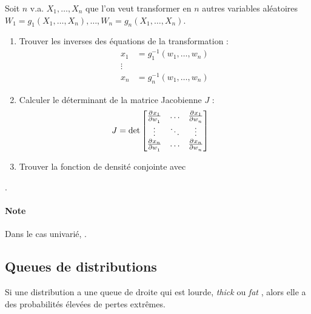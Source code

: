 \documentclass[french]{article}
\begin{document}
\begin{multicols*}{2}
\begin{algo2}
Soit $n$ v.a. $X_{1}, \dots, X_{n}$ que l'on veut transformer en $n$ autres variables aléatoires $W_{1}	=	g_{1}(X_{1}, \dots, X_{n}), \dots, W_{n}	=	g_{n}(X_{1}, \dots, X_{n})$.
\begin{enumerate}[label	=	\circled{\arabic*}{trueblue}]
	\item	Trouver les inverses des équations de la transformation : 
		\begin{align*}
		x_{1}	
		&=	g^{-1}_{1}(w_{1}, \dots, w_{n})	\\
		\vdots	\\
		x_{n}	
		&=	g^{-1}_{n}(w_{1}, \dots, w_{n})	
		\end{align*}
	\item	Calculer le déterminant de la matrice Jacobienne $J$ : 
		\begin{align*}
		J
		&=	\det \begin{bmatrix}
		\deriv{w_{1}}{x_{1}}	&	\hdots	&	\deriv{w_{n}}{x_{1}}	\\
		\vdots	&	\ddots	&	\vdots	\\
		\deriv{w_{1}}{x_{n}}		&	\hdots	&	\deriv{w_{n}}{x_{n}}
		\end{bmatrix}
		\end{align*}
	\item	Trouver la fonction de densité conjointe avec 
\end{enumerate}
.

\paragraph{Note}	Dans le cas univarié, .
\end{algo2}



\columnbreak
\subsection{Queues de distributions}
\begin{rappel_enhanced}[Contexte]
Si une distribution a une queue de droite qui est lourde, \og \textit{thick} \fg{} ou \og \textit{fat} \fg{}, alors elle a des probabilités élevées de pertes extrêmes.
\end{rappel_enhanced}


\end{multicols*}
\end{document}
